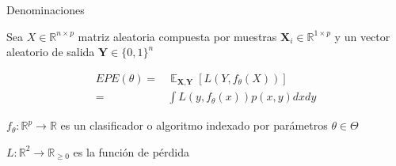 \documentclass[xcolor=x11names]{beamer}
\DeclareMathOperator{\Expect}{\mathbb{E}}
\begin{document}
\begin{frame}{Denominaciones}
		\centering

		Sea $X \in \mathbb{R}^{n \times p}$ matriz aleatoria compuesta por muestras $\textbf{X}_i \in \mathbb{R}^{1 \times p}$ y un vector aleatorio de salida $\textbf{Y} \in \{0,1\}^n$

	\begin{equation}%
		\begin{split}
		EPE(\theta) = & \Expect_{\textbf{X},\textbf{Y}} \left[ L(Y,f_\theta(X))\right]  \\
			= & \int L(y,f_\theta (x)) p(x,y) dx dy
		\end{split}
	\end{equation}





	\smallskip
	$f_\theta: \mathbb{R}^{p} \rightarrow  \mathbb{R} $ es un clasificador o algoritmo indexado por parámetros $\theta \in \Theta$

	\smallskip
	$L: \mathbb{R}^{2} \rightarrow  \mathbb{R}_{\geq 0} $ es la función de pérdida


\end{frame}
\end{document}
